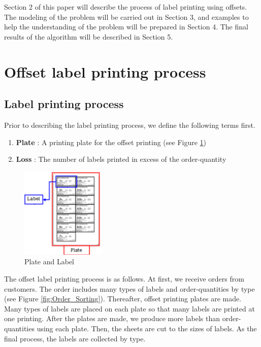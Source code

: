 Section 2 of this paper will describe the process of label printing using offsets. The modeling of the problem will be carried out in Section 3, and examples to help the understanding of the problem will be prepared in Section 4. The final results of the algorithm will be described in Section 5. 


\section{Offset label printing process}\label{sec:Offset}

\subsection{Label printing process}\label{subsec:LabelPrinting}
Prior to describing the label printing process, we define the following terms first.
\begin{enumerate}[*]
	\item {\bf Plate} : A printing plate for the offset printing (see Figure \ref{fig:PlateLabel})
	\item {\bf Loss} : The number of labels printed in excess of the order-quantity
\end{enumerate}

\begin{figure}
	\includegraphics[width=4cm]{PlateLabel.pdf}
	\caption{Plate and Label}
	\label{fig:PlateLabel}       %
\end{figure}

The offset label printing process is as follows. At first, we receive orders from customers. The order includes many types of labels and order-quantities by type (see Figure \ref{fig:Order_Sorting}). Thereafter, offset printing plates are made. Many types of labels are placed on each plate so that many labels are printed at one printing. After the plates are made, we produce more labels than order-quantities using each plate. Then, the sheets are cut to the sizes of labels. As the final process, the labels are collected by type.

